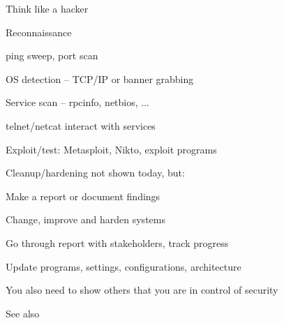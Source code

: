 \documentclass[Screen16to9,17pt]{foils}
\begin{document}
\begin{list1}
\item Think like a hacker
\item Reconnaissance
\begin{list2}
\item ping sweep, port scan
\item OS detection -- TCP/IP or banner grabbing
\item Service scan -- rpcinfo, netbios, ...
\item telnet/netcat interact with services
\end{list2}
\item Exploit/test: Metasploit, Nikto, exploit programs
\item Cleanup/hardening not shown today, but:
\begin{list2}
\item Make a report or document findings
\item Change, improve and harden systems
\item Go through report with stakeholders, track progress
\item Update programs, settings, configurations, architecture
\end{list2}
\item You also need to show others that you are in control of security
\end{list1}





See also 

\end{document}
